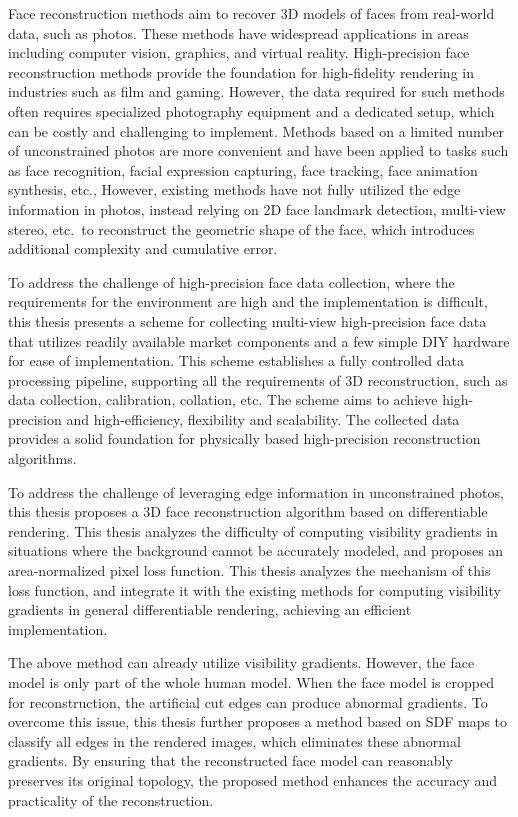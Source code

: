 \documentclass{scutmaster}
\begin{document}
Face reconstruction methods aim to recover 3D models of faces from real-world data, such as photos.
These methods have widespread applications in areas including computer vision, graphics, and virtual reality.
High-precision face reconstruction methods provide the foundation for high-fidelity rendering in industries such as film and gaming.
However, the data required for such methods often requires specialized photography equipment and a dedicated setup,
which can be costly and challenging to implement.
Methods based on a limited number of unconstrained photos are more convenient and
have been applied to tasks such as face recognition, facial expression capturing, face tracking, face animation synthesis, etc.,
However, existing methods have not fully utilized the edge information in photos,
instead relying on 2D face landmark detection, multi-view stereo, etc.\ to reconstruct the geometric shape of the face,
which introduces additional complexity and cumulative error.

To address the challenge of high-precision face data collection,
where the requirements for the environment are high and the implementation is difficult,
this thesis presents a scheme for collecting multi-view high-precision face data
that utilizes readily available market components and a few simple DIY hardware for ease of implementation.
This scheme establishes a fully controlled data processing pipeline,
supporting all the requirements of 3D reconstruction, such as data collection, calibration, collation, etc.
The scheme aims to achieve high-precision and high-efficiency, flexibility and scalability.
The collected data provides a solid foundation for physically based high-precision reconstruction algorithms.

To address the challenge of leveraging edge information in unconstrained photos,
this thesis proposes a 3D face reconstruction algorithm based on differentiable rendering.
This thesis analyzes the difficulty  of computing visibility gradients in situations where the background cannot be accurately modeled,
and proposes an area-normalized pixel loss function.
This thesis analyzes the mechanism of this loss function,
and integrate it with the existing methods for computing visibility gradients in general differentiable rendering,
achieving an efficient implementation.

The above method can already utilize visibility gradients.
However, the face model is only part of the whole human model.
When the face model is cropped for reconstruction,
the artificial cut edges can produce abnormal gradients.
To overcome this issue, this thesis further proposes a method based on SDF maps to classify all edges in the rendered images,
which eliminates these abnormal gradients.
By ensuring that the reconstructed face model can reasonably preserves its original topology,
the proposed method enhances the accuracy and practicality of the reconstruction.
\end{document}
